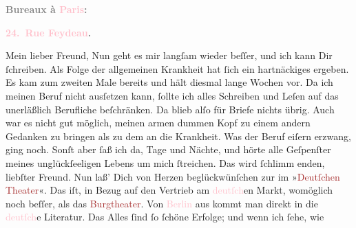            \pstart
           \begin{otherlanguage}{french}\textcolor{gray}{\textbf{\textbf{Bureaux à \textcolor{pink}{Paris}{}\ledrightnote{\textcolor{pink}{Paris}}:}}}\end{otherlanguage}\pend
           \pstart
           \begin{otherlanguage}{french}\textcolor{gray}{\textbf{\textbf{\textcolor{pink}{24. Rue Feydeau}{}\ledrightnote{\textcolor{pink}{rue Feydeau}}.}}}\end{otherlanguage}\pend
           \pstart{}Mein lieber Freund,\pend\pstart
           Nun geht es mir langſam wieder beſſer, und ich kann Dir ſchreiben. Als Folge der
               allgemeinen Krankheit hat ſich ein hartnäckiges \label{K_L02729-44v}\label{K_L02729-44h}
               ergeben. Es kam zum zweiten Male bereits und hält diesmal lange Wochen vor. Da ich
               meinen Beruf nicht ausſetzen kann, ſollte ich alles Schreiben und Leſen auf das
               unerläßlich Berufliche beſchränken. Da blieb alſo für Briefe nichts übrig. Auch war
               es nicht gut möglich, meinen armen dummen Kopf zu einem andern Gedanken zu bringen
               als zu dem an die Krankheit. Was der Beruf eiſern {\pb}erzwang,  ging noch. Sonſt aber ſaß ich da,
               Tage und Nächte, und hörte alle Geſpenſter meines unglückſeeligen Lebens um mich
               ſtreichen. Das wird ſchlimm enden, liebſter Freund.\pend
           \pstart
           Nun laß’ Dich von Herzen beglückwünſchen zur \label{K_L02729-1v}\label{K_L02729-1h} im »\textcolor{brown}{Deutſchen Theater}{}\ledrightnote{\textcolor{brown}{Deutsches Theater Berlin}}«. \strikeout{\textcolor{gray}{Ve}} Das iſt, in Bezug auf den Vertrieb am \textcolor{pink}{deutſch}{}en Markt, womöglich noch beſſer, als das \textcolor{brown}{Burgtheater}{}\ledrightnote{\textcolor{brown}{Burgtheater}}. Von \textcolor{pink}{Berlin}{}\ledrightnote{\textcolor{pink}{Berlin}}
               aus kommt man direkt in die \textcolor{pink}{deutſch}{}e Literatur. Das Alles ſind ſo ſchöne Erfolge; und wenn ich ſehe, wie
